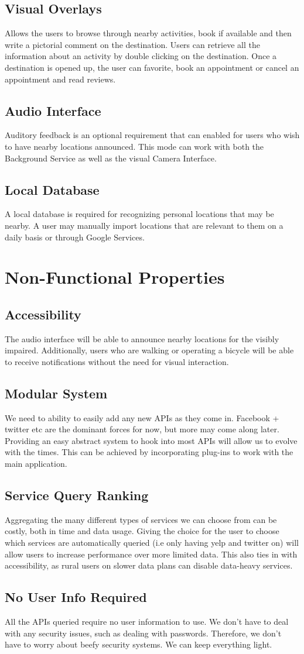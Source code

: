 \documentclass{article}
\begin{document}
\subsection{Visual Overlays}
Allows the users to browse through nearby activities, book if available and then write a pictorial comment on the destination. Users can retrieve all the information about an activity by double clicking on the destination. Once a destination is opened up, the user can favorite, book an appointment or cancel an appointment and read reviews.
\subsection{Audio Interface}
Auditory feedback is an optional requirement that can enabled for users who wish to have nearby locations announced.  This mode can work with both the Background Service as well as the visual Camera Interface.
\subsection{Local Database}
A local database is required for recognizing personal locations that may be nearby.  A user may manually import locations that are relevant to them on a daily basis or through Google Services.
\section{Non-Functional Properties}
\subsection{Accessibility}
The audio interface will be able to announce nearby locations for the visibly impaired.  Additionally, users who are walking or operating a bicycle will be able to receive notifications without the need for visual interaction.
\subsection{Modular System}
We need to ability to easily add any new APIs as they come in. Facebook + twitter etc are the dominant forces for now, but more may come along later. Providing an easy abstract system to hook into most APIs will allow us to evolve with the times.  This can be achieved by incorporating plug-ins to work with the main application.
\subsection{Service Query Ranking}
Aggregating the many different types of services we can choose from can be costly, both in time and data usage. Giving the choice for the user to choose which services are automatically queried (i.e only having yelp and twitter on) will allow users to increase performance over more limited data. This also ties in with accessibility, as rural users on slower data plans can disable data-heavy services.
\subsection{No User Info Required}
All the APIs queried require no user information to use. We don’t have to deal with any security issues, such as dealing with passwords. Therefore, we don’t have to worry about beefy security systems. We can keep everything light.
\end{document}
